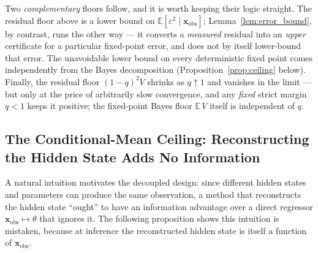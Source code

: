 Two \emph{complementary} floors follow, and it is worth keeping their logic straight. The residual floor above is a lower bound on $\mathbb{E}[\varepsilon^2\mid\mathbf{x}_\mathrm{obs}]$; Lemma~\ref{lem:error_bound}, by contrast, runs the other way --- it converts a \emph{measured} residual into an \emph{upper} certificate for a particular fixed-point error, and does not by itself lower-bound that error. The unavoidable lower bound on every deterministic fixed point comes independently from the Bayes decomposition (Proposition~\ref{prop:ceiling} below). Finally, the residual floor $(1-q)^2V$ shrinks as $q\uparrow1$ and vanishes in the limit --- but only at the price of arbitrarily slow convergence, and any \emph{fixed} strict margin $q<1$ keeps it positive; the fixed-point Bayes floor $\mathbb{E}\,V$ itself is independent of $q$.

\subsection{The Conditional-Mean Ceiling: Reconstructing the Hidden State Adds No Information}
\label{subsec:ceiling}

A natural intuition motivates the decoupled design: since different hidden states and parameters can produce the same observation, a method that reconstructs the hidden state ``ought'' to have an information advantage over a direct regressor $\mathbf{x}_\mathrm{obs}\mapsto\theta$ that ignores it. The following proposition shows this intuition is mistaken, because at inference the reconstructed hidden state is itself a function of $\mathbf{x}_\mathrm{obs}$.

